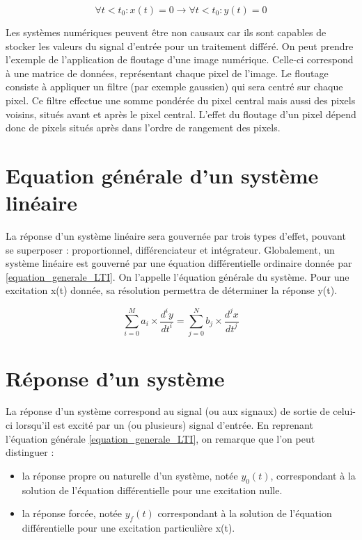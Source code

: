 \documentclass[]{book}
\begin{document}
{	\begin{equation}\label{def_causal}
	\forall t < t_{0} : x(t) = 0 \rightarrow \forall t < t_{0} : y(t) = 0
	\end{equation}
	
	Les systèmes numériques peuvent être non causaux car ils sont capables de stocker les valeurs du signal d'entrée pour un traitement différé. On peut prendre l'exemple de l'application de floutage d'une image numérique. Celle-ci correspond à une matrice de données, représentant chaque pixel de l'image. Le floutage consiste à appliquer un filtre (par exemple gaussien) qui sera centré sur chaque pixel. Ce filtre effectue une somme pondérée du pixel central mais aussi des pixels voisins, situés avant et après le pixel central. L'effet du floutage d'un pixel dépend donc de pixels situés après dans l'ordre de rangement des pixels. 

	
	
	\section{Equation générale d'un système linéaire}
	La réponse d'un système linéaire sera gouvernée par trois types d'effet, pouvant se superposer : proportionnel, différenciateur et intégrateur. Globalement, un système linéaire est gouverné par une équation différentielle ordinaire donnée par \ref{equation_generale_LTI}. On l'appelle l'équation générale du système. Pour une excitation x(t) donnée, sa résolution permettra de déterminer la réponse y(t).
	
	\begin{equation}\label{equation_generale_LTI}
	\sum_{i=0}^M a_{i}\times \frac{d^{i}y}{dt^{i}} = \sum_{j=0}^N b_{j}\times \frac{d^{j}x}{dt^{j}}
	\end{equation}
	
	
	\section{Réponse d'un système}
	La réponse d'un système correspond au signal (ou aux signaux) de sortie de celui-ci lorsqu'il est excité par un (ou plusieurs) signal d'entrée. En reprenant l'équation générale \ref{equation_generale_LTI}, on remarque que l'on peut distinguer :
	\begin{itemize}
		\item la réponse propre ou naturelle d'un système, notée $y_{0}(t)$, correspondant à la solution de l'équation différentielle pour une excitation nulle.
		\item la réponse forcée, notée $y_{f}(t)$ correspondant à la solution de l'équation différentielle pour une excitation particulière x(t).
	\end{itemize}
	
}
\end{document}
